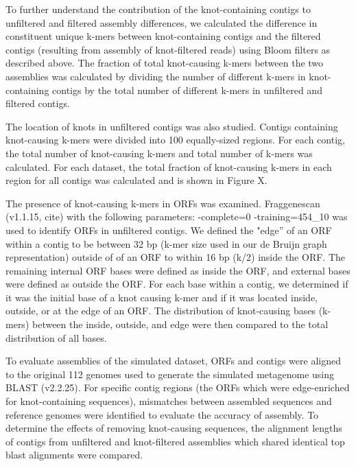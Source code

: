 \documentclass[11pt]{article} %
\begin{document}
To further understand the contribution of the knot-containing
contigs to unfiltered and filtered assembly differences, we calculated
the difference in constituent unique k-mers between knot-containing
contigs and the filtered contigs (resulting from assembly of knot-filtered reads)
using Bloom filters as described above. The fraction of total knot-causing
k-mers between the two assemblies was calculated by dividing the number
of different k-mers in knot-containing contigs by the total number
of different k-mers in unfiltered and filtered contigs. 

The location of knots in unfiltered contigs was also studied. Contigs containing
knot-causing k-mers were divided into 100 equally-sized regions. For
each contig, the total number of knot-causing k-mers and total number
of k-mers was calculated. For each dataset, the total fraction of
knot-causing k-mers in each region for all contigs was calculated
and is shown in Figure X.

The presence of knot-causing k-mers in ORFs was examined. Fraggenescan
(v1.1.15, cite) with the following parameters: -complete=0 -training=454\_10
was used to identify ORFs in unfiltered contigs. We defined the "edge''
of an ORF within a contig to be between 32 bp (k-mer size used in
our de Bruijn graph representation) outside of of an ORF to within
16 bp (k/2) inside the ORF. The remaining internal ORF bases were
defined as inside the ORF, and external bases were defined as outside
the ORF. For each base within a contig, we determined if it was the
initial base of a knot causing k-mer and if it was located inside, outside,
or at the edge of an ORF. The distribution of knot-causing bases (k-mers)
between the inside, outside, and edge were then compared to the total
distribution of all bases. 

To evaluate assemblies of the simulated dataset, ORFs and contigs were aligned to the original 112 genomes used to generate the simulated metagenome using BLAST (v2.2.25).  For specific contig regions (the ORFs which were edge-enriched for knot-containing sequences), mismatches between assembled sequences and reference genomes were identified to evaluate the accuracy of assembly.  To determine the effects of removing knot-causing sequences, the alignment lengths of contigs from unfiltered and knot-filtered assemblies which shared identical top blast alignments were compared.    

	
	





\end{document}
